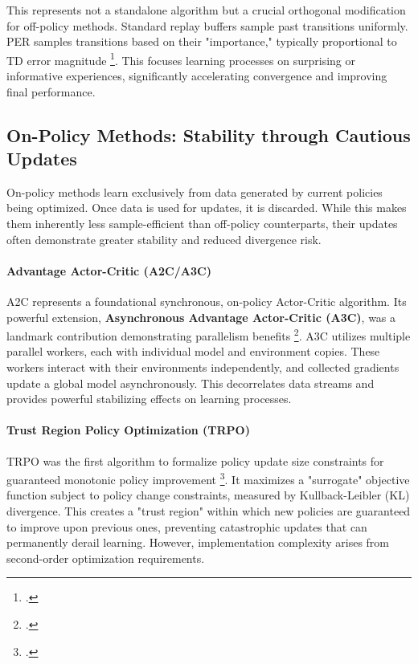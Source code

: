 This represents not a standalone algorithm but a crucial orthogonal modification for off-policy methods. Standard replay buffers sample past transitions uniformly. PER samples transitions based on their "importance," typically proportional to TD error magnitude \footcite{schaul2015prioritized}. This focuses learning processes on surprising or informative experiences, significantly accelerating convergence and improving final performance.

\subsection{On-Policy Methods: Stability through Cautious Updates}

On-policy methods learn exclusively from data generated by current policies being optimized. Once data is used for updates, it is discarded. While this makes them inherently less sample-efficient than off-policy counterparts, their updates often demonstrate greater stability and reduced divergence risk.

\paragraph{Advantage Actor-Critic (A2C/A3C)}

A2C represents a foundational synchronous, on-policy Actor-Critic algorithm. Its powerful extension, \textbf{Asynchronous Advantage Actor-Critic (A3C)}, was a landmark contribution demonstrating parallelism benefits \footcite{mnih2016asynchronous}. A3C utilizes multiple parallel workers, each with individual model and environment copies. These workers interact with their environments independently, and collected gradients update a global model asynchronously. This decorrelates data streams and provides powerful stabilizing effects on learning processes.

\paragraph{Trust Region Policy Optimization (TRPO)}

TRPO was the first algorithm to formalize policy update size constraints for guaranteed monotonic policy improvement \footcite{schulman2020trust}. It maximizes a "surrogate" objective function subject to policy change constraints, measured by Kullback-Leibler (KL) divergence. This creates a "trust region" within which new policies are guaranteed to improve upon previous ones, preventing catastrophic updates that can permanently derail learning. However, implementation complexity arises from second-order optimization requirements.

